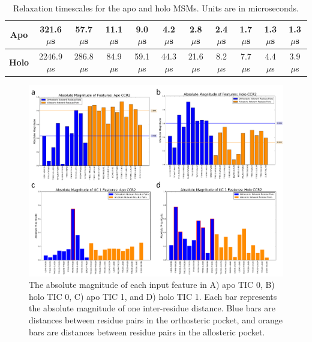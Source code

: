 \begin{table}
\centering
\begin{tabular}{|c|c|c|c|c|c|c|c|c|c|c|}
\hline
\textbf{Apo} & 321.6 $\mu$s & 57.7 $\mu$s & 11.1 $\mu$s & 9.0 $\mu$s & 4.2 $\mu$s & 2.8 $\mu$s & 2.4 $\mu$s & 1.7 $\mu$s & 1.3 $\mu$s & 1.3 $\mu$s\\ \hline
\textbf{Holo} & 2246.9 $\mu$s & 286.8 $\mu$s & 84.9 $\mu$s & 59.1 $\mu$s & 44.3 $\mu$s & 21.6 $\mu$s & 8.2 $\mu$s & 7.7 $\mu$s & 4.4 $\mu$s & 3.9 $\mu$s \\ \hline
\end{tabular}
\caption{Relaxation timescales for the apo and holo MSMs. Units are in microseconds.}
\label{table:relaxation_timescales}
\end{table}
\begin{figure}
  \begin{center}
  \includegraphics[width=\textwidth]{./figures/tic0_tic1_contributions.png}
\caption{The absolute magnitude of each input feature in A) apo TIC 0, B) holo TIC 0, C) apo TIC 1, and D) holo TIC 1. Each bar represents the absolute magnitude of one inter-residue distance. Blue bars are distances between residue pairs in the orthosteric pocket, and orange bars are distances between residue pairs in the allosteric pocket.}
\label{fig:tic0_contributions}
  \end{center}
\end{figure}

